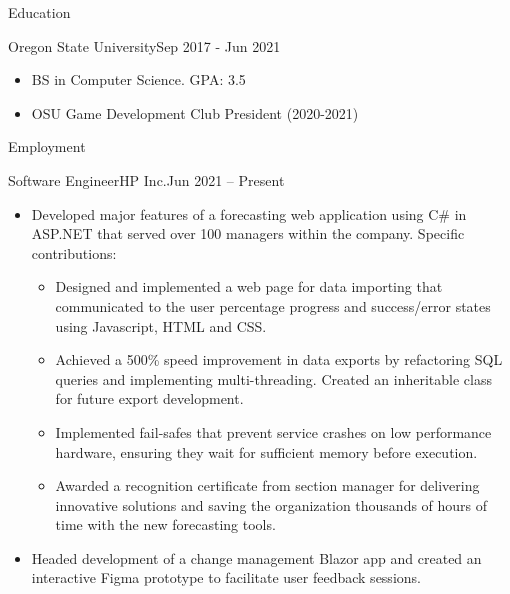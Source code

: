 \documentclass[]{mcdowellcv}
\begin{document}
\makeheader
\vspace{-4pt}

\begin{cvsection}{Education}
	\begin{cvsubsection}{Oregon State University}{}{Sep 2017 - Jun 2021}
        \vspace{-4pt}
		\begin{itemize}
			\item BS in Computer Science. GPA: 3.5
                \item OSU Game Development Club President (2020-2021)
		\end{itemize}
        \vspace{-12pt}
	\end{cvsubsection}
\end{cvsection}
\begin{cvsection}{Employment}
    \begin{cvsubsection}{Software Engineer}{HP Inc.}{Jun 2021 -- Present}
            \vspace{-4pt}
          \begin{itemize}%
              \item Developed major features of a forecasting web application using C\# in ASP.NET that served over 100 managers within the company. Specific contributions:
                \begin{itemize}%
                    \item Designed and implemented a web page for data importing that communicated to the user percentage progress and success/error states using Javascript, HTML and CSS.
                    \item Achieved a 500\% speed improvement in data exports by refactoring SQL queries and implementing multi-threading. Created an inheritable class for future export development.
                    \item Implemented fail-safes that prevent service crashes on low performance hardware, ensuring they wait for sufficient memory before execution.      
                    \item Awarded a recognition certificate from section manager for delivering innovative solutions and saving the organization thousands of hours of time with the new forecasting tools.
                \end{itemize} 
            \end{itemize}
            \begin{itemize}%
            \item Headed development of a change management Blazor app and created an interactive Figma prototype to facilitate user feedback sessions.

\end{itemize}
\end{cvsubsection}
\end{cvsection}
\end{document}
